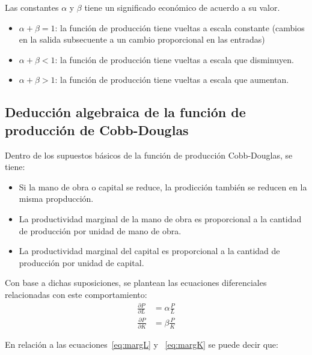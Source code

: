 Las constantes $\alpha$ y $\beta$ tiene un significado económico de acuerdo a su valor.

\begin{itemize}
	\item $\alpha+\beta=1$: la función de producción tiene vueltas a escala constante (cambios en la salida subsecuente a un cambio proporcional en las entradas)
	\item $\alpha+\beta<1$: la función de producción tiene vueltas a escala que disminuyen.
	\item $\alpha+\beta>1$: la función de producción tiene vueltas a escala que aumentan.
\end{itemize}

\subsection{Deducción algebraica de la función de producción de Cobb-Douglas}

Dentro de los supuestos básicos de la función de producción Cobb-Douglas, se tiene:
\begin{itemize}
	\item Si la mano de obra o capital se reduce, la prodicción también se reducen en la misma propducción.
	\item La productividad marginal de la mano de obra es proporcional a la cantidad de producción por unidad de mano de obra.
	\item La productividad marginal del capital es proporcional a la cantidad de producción por unidad de capital.
\end{itemize}
Con base a dichas suposiciones, se plantean las ecuaciones diferenciales relacionadas con este comportamiento:
\begin{align}
\frac{\partial P}{\partial L}
&=\alpha\frac{P}{L}\label{eq:margL}\\
\frac{\partial P}{\partial K}
&=\beta\frac{P}{K}\label{eq:margK}
\end{align}

En relación a las ecuaciones~\eqref{eq:margL} y ~\eqref{eq:margK} se puede decir que:

